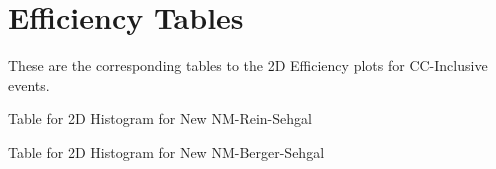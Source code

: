 \documentclass[11pt]{article}
\begin{document}
%


\section{Efficiency Tables} \label{sec:EffTab}

These are the corresponding tables to the 2D Efficiency plots for CC-Inclusive events.

\newpage
\begin{landscape}
\begin{table}
\centering
\caption{Table for 2D Histogram for New NM-Rein-Sehgal}
\begin{adjustbox}{width=\paperwidth}
\end{adjustbox}
\end{table}
\end{landscape}

\newpage
\begin{landscape}
\begin{table}
\centering
\caption{Table for 2D Histogram for New NM-Berger-Sehgal}
\begin{adjustbox}{width=\paperwidth}
\end{adjustbox}
\end{table}
\end{landscape}
\end{document}
